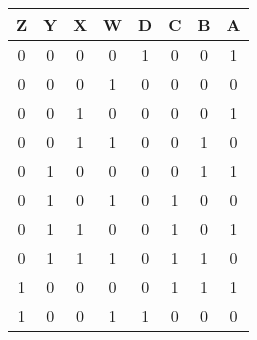 \begin{center}
\begin{tabular}{|c|c|c|c||c|c|c|c|}
\hline
Z & Y & X & W & D & C & B & A\\
\hline
0 & 0 & 0 & 0 & 1 & 0 & 0 & 1\\
0 & 0 & 0 & 1 & 0 & 0 & 0 & 0\\
0 & 0 & 1 & 0 & 0 & 0 & 0 & 1\\
0 & 0 & 1 & 1 & 0 & 0 & 1 & 0\\
0 & 1 & 0 & 0 & 0 & 0 & 1 & 1\\
0 & 1 & 0 & 1 & 0 & 1 & 0 & 0\\
0 & 1 & 1 & 0 & 0 & 1 & 0 & 1\\
0 & 1 & 1 & 1 & 0 & 1 & 1 & 0\\
1 & 0 & 0 & 0 & 0 & 1 & 1 & 1\\
1 & 0 & 0 & 1 & 1 & 0 & 0 & 0\\
\hline
\end{tabular}
\end{center}

